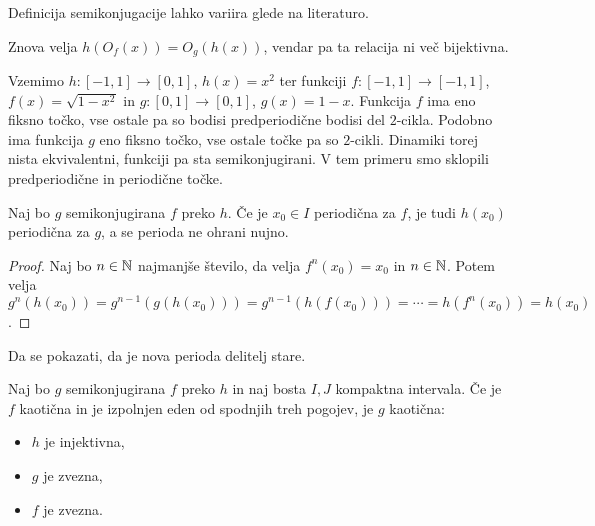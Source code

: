 \begin{opomba}
  Definicija semikonjugacije lahko variira glede na literaturo.
\end{opomba}

\begin{opomba}
  Znova velja $h(O_f(x)) = O_g(h(x))$, vendar pa ta relacija ni več bijektivna.
\end{opomba}

\begin{primer}
  Vzemimo $h: [-1,1] \to [0,1]$, $h(x) = x^2$ ter funkciji $f: [-1, 1] \to [-1,
  1]$, $f(x) = \sqrt{1-x^2}$ in $g:[0,1] \to [0,1]$, $g(x) = 1-x$.
  Funkcija $f$ ima eno fiksno točko, vse ostale pa so bodisi predperiodične
  bodisi del $2$-cikla.
  Podobno ima funkcija $g$ eno fiksno točko, vse ostale točke pa so $2$-cikli.
  Dinamiki torej nista ekvivalentni, funkciji pa sta semikonjugirani.
  V tem primeru smo sklopili predperiodične in periodične točke.
\end{primer}

\begin{trditev}
  Naj bo $g$ semikonjugirana $f$ preko $h$.
  Če je $x_0 \in I$ periodična za $f$, je tudi $h(x_0)$ periodična za $g$, a se
  perioda ne ohrani nujno.
\end{trditev}

\begin{proof}
  Naj bo $n \in \mathbb{N}$ najmanjše število, da velja $f^n(x_0) = x_0$ in $n \in \mathbb{N}$.
  Potem velja $g^n(h(x_0)) = g^{n-1}(g(h(x_0))) = g^{n-1}(h(f(x_0))) = \cdots =
  h(f^n(x_0)) = h(x_0)$.
\end{proof}

\begin{opomba}
  Da se pokazati, da je nova perioda delitelj stare.
\end{opomba}

\begin{izrek}
  Naj bo $g$ semikonjugirana $f$ preko $h$ in naj bosta $I,J$ kompaktna
  intervala.
  Če je $f$ kaotična in je izpolnjen eden od spodnjih treh pogojev, je $g$
  kaotična:
  \begin{itemize}
  \item $h$ je injektivna,
  \item $g$ je zvezna,
  \item $f$ je zvezna.
  \end{itemize}
\end{izrek}


